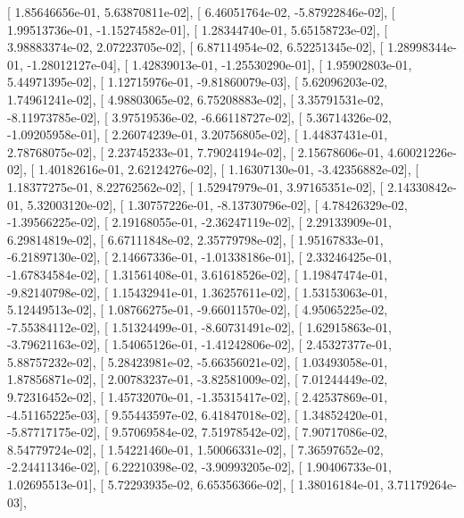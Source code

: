 \documentclass{article}
\begin{document}
       [  1.85646656e-01,   5.63870811e-02],
       [  6.46051764e-02,  -5.87922846e-02],
       [  1.99513736e-01,  -1.15274582e-01],
       [  1.28344740e-01,   5.65158723e-02],
       [  3.98883374e-02,   2.07223705e-02],
       [  6.87114954e-02,   6.52251345e-02],
       [  1.28998344e-01,  -1.28012127e-04],
       [  1.42839013e-01,  -1.25530290e-01],
       [  1.95902803e-01,   5.44971395e-02],
       [  1.12715976e-01,  -9.81860079e-03],
       [  5.62096203e-02,   1.74961241e-02],
       [  4.98803065e-02,   6.75208883e-02],
       [  3.35791531e-02,  -8.11973785e-02],
       [  3.97519536e-02,  -6.66118727e-02],
       [  5.36714326e-02,  -1.09205958e-01],
       [  2.26074239e-01,   3.20756805e-02],
       [  1.44837431e-01,   2.78768075e-02],
       [  2.23745233e-01,   7.79024194e-02],
       [  2.15678606e-01,   4.60021226e-02],
       [  1.40182616e-01,   2.62124276e-02],
       [  1.16307130e-01,  -3.42356882e-02],
       [  1.18377275e-01,   8.22762562e-02],
       [  1.52947979e-01,   3.97165351e-02],
       [  2.14330842e-01,   5.32003120e-02],
       [  1.30757226e-01,  -8.13730796e-02],
       [  4.78426329e-02,  -1.39566225e-02],
       [  2.19168055e-01,  -2.36247119e-02],
       [  2.29133909e-01,   6.29814819e-02],
       [  6.67111848e-02,   2.35779798e-02],
       [  1.95167833e-01,  -6.21897130e-02],
       [  2.14667336e-01,  -1.01338186e-01],
       [  2.33246425e-01,  -1.67834584e-02],
       [  1.31561408e-01,   3.61618526e-02],
       [  1.19847474e-01,  -9.82140798e-02],
       [  1.15432941e-01,   1.36257611e-02],
       [  1.53153063e-01,   5.12449513e-02],
       [  1.08766275e-01,  -9.66011570e-02],
       [  4.95065225e-02,  -7.55384112e-02],
       [  1.51324499e-01,  -8.60731491e-02],
       [  1.62915863e-01,  -3.79621163e-02],
       [  1.54065126e-01,  -1.41242806e-02],
       [  2.45327377e-01,   5.88757232e-02],
       [  5.28423981e-02,  -5.66356021e-02],
       [  1.03493058e-01,   1.87856871e-02],
       [  2.00783237e-01,  -3.82581009e-02],
       [  7.01244449e-02,   9.72316452e-02],
       [  1.45732070e-01,  -1.35315417e-02],
       [  2.42537869e-01,  -4.51165225e-03],
       [  9.55443597e-02,   6.41847018e-02],
       [  1.34852420e-01,  -5.87717175e-02],
       [  9.57069584e-02,   7.51978542e-02],
       [  7.90717086e-02,   8.54779724e-02],
       [  1.54221460e-01,   1.50066331e-02],
       [  7.36597652e-02,  -2.24411346e-02],
       [  6.22210398e-02,  -3.90993205e-02],
       [  1.90406733e-01,   1.02695513e-01],
       [  5.72293935e-02,   6.65356366e-02],
       [  1.38016184e-01,   3.71179264e-03],
\end{document}
